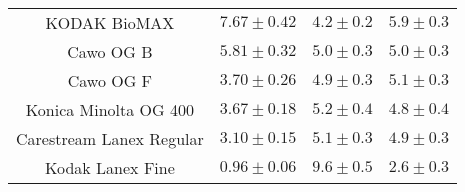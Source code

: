 \begin{table*}[htb]
\begin{center}
\begin{tabular}{|c|c|c|c|}
KODAK BioMAX             & $7.67 \pm 0.42$                                                                               & $4.2 \pm 0.2$                                                                   & $5.9 \pm 0.3$                                                                  \\
Cawo OG B                & $5.81 \pm 0.32$                                                                               & $5.0 \pm 0.3$                                                                   & $5.0 \pm 0.3$                                                                  \\
Cawo OG F                & $3.70 \pm 0.26$                                                                               & $4.9 \pm 0.3$                                                                   & $5.1 \pm 0.3$                                                                  \\
Konica Minolta OG 400    & $3.67 \pm 0.18$                                                                               & $5.2 \pm 0.4$                                                                   & $4.8 \pm 0.4$                                                                  \\
Carestream Lanex Regular & $3.10 \pm 0.15$                                                                               & $5.1 \pm 0.3$                                                                   & $4.9 \pm 0.3$                                                                  \\
Kodak Lanex Fine         & $0.96 \pm 0.06$                                                                               & $9.6 \pm 0.5$                                                                   & $2.6 \pm 0.3$                                                                  \\
\hline
\end{tabular}
\end{center}
\end{table*}

